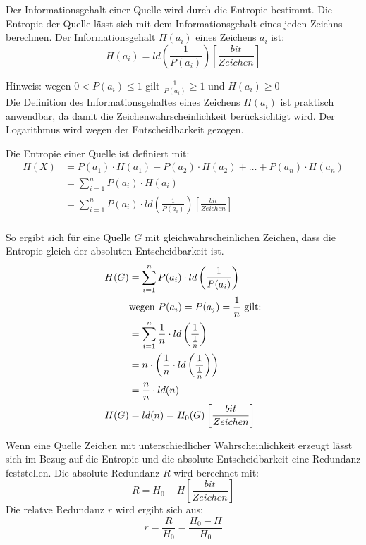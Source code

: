 Der Informationsgehalt einer Quelle wird durch die Entropie bestimmt. Die Entropie der Quelle lässt sich mit dem Informationsgehalt eines jeden Zeichns berechnen. Der Informationsgehalt $H(a_i)$ eines Zeichens $a_i$ ist:
$$ 
	H(a_i) = ld \left( \frac{1}{P(a_i)} \right) \left[ \frac{bit}{Zeichen} \right]
$$

Hinweis: wegen $0 < P(a_i) \le 1$ gilt $\frac{1}{P(a_i)} \ge 1$ und $H(a_i) \ge 0$ \\
Die Definition des Informationsgehaltes eines Zeichens $H(a_i)$ ist praktisch anwendbar, da damit die Zeichenwahrscheinlichkeit berücksichtigt wird. Der Logarithmus wird wegen der Entscheidbarkeit gezogen.

Die Entropie einer Quelle ist definiert mit:
\begin{align*}
	H(X) &= P(a_1) \cdot H(a_1) + P(a_2) \cdot H(a_2) + \ldots + P(a_n) \cdot H(a_n) \\
	     &= \sum_{i=1}^n P(a_i) \cdot H(a_i) \\
	     &= \sum_{i=1}^n P(a_i) \cdot ld \left( \frac{1}{P(a_i)} \right) \left[ \frac{bit}{Zeichen} \right]\\
\end{align*}

So ergibt sich für eine Quelle $G$ mit gleichwahrscheinlichen Zeichen, dass die Entropie gleich der absoluten Entscheidbarkeit ist.
\begin{align*}
	H(G) &= \sum_{i=1}^n P(a_i) \cdot ld \left( \frac{1}{P(a_i)} \right) \\
	     & \textnormal{wegen } P(a_i) = P(a_j) = \frac{1}{n} \textnormal{ gilt:} \\
	     &= \sum_{i=1}^n \frac{1}{n} \cdot ld \left( \frac{1}{\frac{1}{n}} \right) \\
	     &= n \cdot \left( \frac{1}{n} \cdot ld \left( \frac{1}{\frac{1}{n}} \right) \right)\\
	     &= \frac{n}{n} \cdot ld(n) \\
	H(G) &= ld(n) = H_0(G) \left[ \frac{bit}{Zeichen} \right]\\
\end{align*}

Wenn eine Quelle Zeichen mit unterschiedlicher Wahrscheinlichkeit erzeugt lässt sich im Bezug auf die Entropie und die absolute Entscheidbarkeit eine Redundanz feststellen. Die absolute Redundanz $R$ wird berechnet mit:
$$
	R = H_0 - H \left[ \frac{bit}{Zeichen} \right]
$$
Die relatve Redundanz $r$ wird ergibt sich aus:
$$
	r = \frac{R}{H_0} = \frac{H_0 - H}{H_0}
$$

